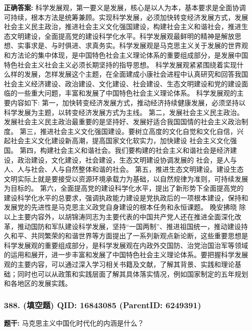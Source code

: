\documentclass[12pt,UTF8]{ctexart}
\begin{document}
\textbf{正确答案:}
科学发展观，第一要义是发展，核心是以人为本，基本要求是全面协调可持续，根本方法是统筹兼顾。实现科学发展，必须加快转变经济发展方式，发展社会主义民主政治，推进社会主义文化强国建设，构建社会主义和谐社会，推进生态文明建设，全面提高党的建设科学化水平。科学发展观最鲜明的精神是解放思想、实事求是、与时俱进、求真务实。科学发展观是马克思主义关于发展的世界观和方法论的集中体现，是中国特色社会主义理论体系的重要组成部分，是发展中国特色社会主义社会主义必须长期坚持的指导思想。
科学发展观紧紧围绕着实现什么样的发展，怎样发展这个主题，在全面建成小康社会进程中认真研究和回答我国社会主义经济建设、政治建设、文化建设、社会建设、生态文明建设和党的建设面临的一些重大问题，丰富和发展了中国特色社会主义理论体系。
科学发展观的主要内容如下:
第一，加快转变经济发展方式，推动经济持续健康发展，必须坚持以科学发展为主题，以转变经济发展方式为主线。
第二，发展社会主义民主政治。发展社会主义民主政治最重要的是坚持好、发展好适合我国国情的社会主义政治制度。
第三，推进社会主义文化强国建设。要树立高度的文化自觉和文化自信，兴起社会主义文化建设新高潮，提高国家文化软实力，加快建设
社会主义文化强国。
第四，构建社会主义和谐社会。我们要构建的社会主义和谐社会是经济建设，政治建设，文化建设，社会建设，生态文明建设协调发展的
社会，是人与人、人与社会、人与自然整体和谐的社会。
第五，推进生态文明建设。建设生态文明实际上就是要接受以资源环境承载力为基础，以自然规律为准则，可持续发展为目标的。
第六，全面提高党的建设科学化水平，提出了新形势下全面提高党的建设科学化水平的总要求，强调执政能力建设是党执政后的一项根本建设，保持和发展党的先进性是马克思主义政党自身建设的根本任务和永恒课题。 晚安拂晓
除以上主要内容外，以胡锦涛同志为主要代表的中国共产党人还在推进全面深化改革，推动国防和军队建设科学发展，坚持“一国两制”、推进祖国统一，推动建设持久和平、共同繁荣的和谐世界等方面提出了一系列新观点新论断，这些重要思想是科学发展观的重要组成部分，是科学发展观在内政外交国防、治党治国治军等领域的运用和展开，进一步丰富和发展了中国特色社会主义理论体系。要把握科学发展观的主要内容，可以通过深入学习相关书籍及文献，了解其背景、实践和理论基础；同时也可以从政策和实践层面了解其具体落实情况，例如国家制定的五年规划和各地区的发展实践。

\vspace{0.3em}\hrulefill\vspace{0.7em}

\subsubsection*{388. (填空题) \small QID: 16843085 (ParentID: 6249391)}

\textbf{题干:}
马克思主义中国化时代化的内涵是什么？
\end{document}
